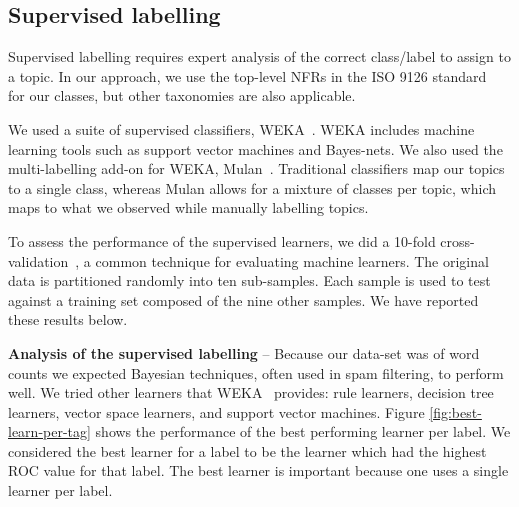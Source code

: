 \documentclass[]{sig-alternate}
\begin{document}
\subsection{Supervised labelling}
\label{sec:suplabelling}
Supervised labelling requires expert analysis of the correct class/label to assign to a topic. In our approach, we use the top-level NFRs in the ISO 9126 standard~\cite{iso9126} for our classes, but other taxonomies are also applicable.%

We used a suite of supervised classifiers, WEKA~\cite{weka09}. 
WEKA includes machine learning tools such as support vector machines and Bayes-nets. 
We also used the multi-labelling add-on for WEKA, Mulan~\cite{mulan}. %
Traditional classifiers map our topics to a single class, whereas Mulan allows for a mixture of classes per topic, which maps to what we observed while manually labelling topics.

To assess the performance of the supervised learners, we did a 10-fold cross-validation~\cite{Kohavi1995}, a common technique for evaluating machine learners. 
The original data is partitioned randomly into ten sub-samples. Each sample is used to test against a training set composed of the nine other samples.
We have reported these results below.%

\textbf{Analysis of the supervised labelling} -- 
Because our data-set was of word counts we expected Bayesian techniques, often used in spam filtering, to perform well. 
We tried other learners that WEKA~\cite{weka09} provides: rule learners, decision tree learners, vector space learners, and support vector machines.  
Figure \ref{fig:best-learn-per-tag} shows the performance of the best performing learner per label. 
 We considered the best learner for a label to be the learner which
 had the highest ROC value for that label. 
The best learner is important because one uses a single learner per label.
\end{document}
